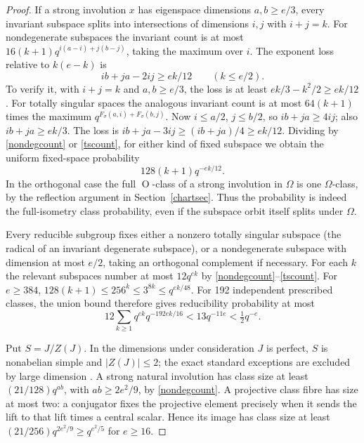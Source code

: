 \documentclass[11pt]{article}
\newcommand{\Or}{\operatorname O}
\newcommand{\Om}{\Omega}
\begin{document}
\begin{proof}
If a strong involution $x$ has eigenspace dimensions $a,b\ge e/3$, every invariant subspace splits into intersections of dimensions $i,j$ with $i+j=k$. For nondegenerate subspaces the invariant count is at most $16(k+1)q^{i(a-i)+j(b-j)}$, taking the maximum over $i$. The exponent loss relative to $k(e-k)$ is
\[
ib+ja-2ij\ge ek/12\qquad(k\le e/2).
\]
To verify it, with $i+j=k$ and $a,b\ge e/3$, the loss is at least $ek/3-k^2/2\ge ek/12$. For totally singular spaces the analogous invariant count is at most $64(k+1)$ times the maximum $q^{F_\sigma(a,i)+F_\sigma(b,j)}$. Now $i\le a/2$, $j\le b/2$, so $ib+ja\ge4ij$; also $ib+ja\ge ek/3$. The loss is $ib+ja-3ij\ge(ib+ja)/4\ge ek/12$. Dividing by \eqref{nondegcount} or \eqref{tscount}, for either kind of fixed subspace we obtain the uniform fixed-space probability
\begin{equation}\label{fixedspace}
128(k+1)q^{-ek/12}.
\end{equation}
In the orthogonal case the full $\Or$-class of a strong involution in $\Om$ is one $\Om$-class, by the reflection argument in Section~\ref{chartsec}. Thus the probability is indeed the full-isometry class probability, even if the subspace orbit itself splits under $\Om$.

Every reducible subgroup fixes either a nonzero totally singular subspace (the radical of an invariant degenerate subspace), or a nondegenerate subspace with dimension at most $e/2$, taking an orthogonal complement if necessary. For each $k$ the relevant subspaces number at most $12q^{ek}$ by \eqref{nondegcount}--\eqref{tscount}. For $e\ge384$, $128(k+1)\le256^k\le3^{8k}\le q^{ek/48}$. For 192 independent prescribed classes, the union bound therefore gives reducibility probability at most
\[
12\sum_{k\ge1}q^{ek}q^{-192ek/16}<13q^{-11e}<\tfrac12q^{-e}.
\]

Put $S=J/Z(J)$. In the dimensions under consideration $J$ is perfect, $S$ is nonabelian simple and $|Z(J)|\le2$; the exact standard exceptions are excluded by large dimension \cite[Theorems~8.7--8.8,11.47--11.48]{taylor}. A strong natural involution has class size at least $(21/128)q^{ab}$, with $ab\ge2e^2/9$, by \eqref{nondegcount}. A projective class fibre has size at most two: a conjugator fixes the projective element precisely when it sends the lift to that lift times a central scalar. Hence its image has class size at least $(21/256)q^{2e^2/9}\ge q^{e^2/5}$ for $e\ge16$.


\end{proof}
\end{document}
